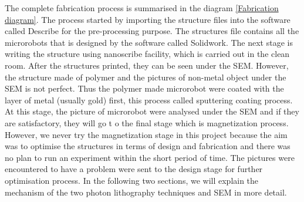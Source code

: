 \documentclass[12pt,a4paper,titlepage]{report}
\begin{document}
The complete fabrication process is summarised in the diagram \ref{Fabrication diagram}.
The process started by importing the structure files into the software called Describe for 
the pre-processing purpose. The structures file contains all the microrobots that is designed by the 
software called Solidwork. The next stage is writing the structure using nanoscribe facility, which is 
carried out in the clean room. After the structures printed, they can be seen under 
the \ac*{SEM}. However, the structure made of polymer and the pictures of non-metal object under 
the \ac*{SEM} is not perfect. Thus the polymer made microrobot were coated with the layer of 
metal (usually gold) first, this process called sputtering coating process.  At this stage, the 
picture of microrobot were analysed under the \ac*{SEM} and if they are satisfactory, they will go t
o the final stage which is magnetization process. However, we never try the magnetization stage 
in this project because the aim was to optimise the structures in terms of design and fabrication and 
there was no plan to run an experiment within the short period of time. The pictures were encountered 
to have a problem were sent to the design stage for further optimisation process. In the following 
two sections, we will explain the mechanism of the two photon lithography techniques and \ac*{SEM} in
 more detail.   
\end{document}
